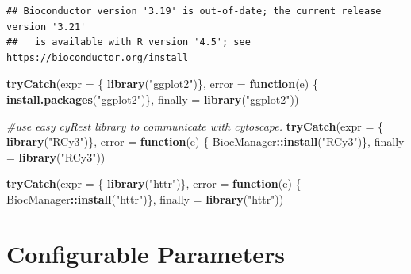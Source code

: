 \documentclass[
]{book}
\newenvironment{Shaded}{\begin{snugshade}}{\end{snugshade}}
\newcommand{\AttributeTok}[1]{\textcolor[rgb]{0.13,0.29,0.53}{#1}}
\newcommand{\CommentTok}[1]{\textcolor[rgb]{0.56,0.35,0.01}{\textit{#1}}}
\newcommand{\ControlFlowTok}[1]{\textcolor[rgb]{0.13,0.29,0.53}{\textbf{#1}}}
\newcommand{\FunctionTok}[1]{\textcolor[rgb]{0.13,0.29,0.53}{\textbf{#1}}}
\newcommand{\NormalTok}[1]{#1}
\newcommand{\SpecialCharTok}[1]{\textcolor[rgb]{0.81,0.36,0.00}{\textbf{#1}}}
\newcommand{\StringTok}[1]{\textcolor[rgb]{0.31,0.60,0.02}{#1}}
\begin{document}
\begin{verbatim}
## Bioconductor version '3.19' is out-of-date; the current release version '3.21'
##   is available with R version '4.5'; see https://bioconductor.org/install
\end{verbatim}

\begin{Shaded}
\begin{Highlighting}[]
\FunctionTok{tryCatch}\NormalTok{(}\AttributeTok{expr =}\NormalTok{ \{ }\FunctionTok{library}\NormalTok{(}\StringTok{"ggplot2"}\NormalTok{)\}, }
         \AttributeTok{error =} \ControlFlowTok{function}\NormalTok{(e) \{ }\FunctionTok{install.packages}\NormalTok{(}\StringTok{"ggplot2"}\NormalTok{)\}, }
         \AttributeTok{finally =} \FunctionTok{library}\NormalTok{(}\StringTok{"ggplot2"}\NormalTok{))}

\CommentTok{\#use easy cyRest library to communicate with cytoscape.}
\FunctionTok{tryCatch}\NormalTok{(}\AttributeTok{expr =}\NormalTok{ \{ }\FunctionTok{library}\NormalTok{(}\StringTok{"RCy3"}\NormalTok{)\}, }
         \AttributeTok{error =} \ControlFlowTok{function}\NormalTok{(e) \{ BiocManager}\SpecialCharTok{::}\FunctionTok{install}\NormalTok{(}\StringTok{"RCy3"}\NormalTok{)\}, }
         \AttributeTok{finally =} \FunctionTok{library}\NormalTok{(}\StringTok{"RCy3"}\NormalTok{))}

\FunctionTok{tryCatch}\NormalTok{(}\AttributeTok{expr =}\NormalTok{ \{ }\FunctionTok{library}\NormalTok{(}\StringTok{"httr"}\NormalTok{)\}, }
         \AttributeTok{error =} \ControlFlowTok{function}\NormalTok{(e) \{ BiocManager}\SpecialCharTok{::}\FunctionTok{install}\NormalTok{(}\StringTok{"httr"}\NormalTok{)\}, }
         \AttributeTok{finally =} \FunctionTok{library}\NormalTok{(}\StringTok{"httr"}\NormalTok{))}
\end{Highlighting}
\end{Shaded}

\section{Configurable Parameters}\label{configurable-parameters-3}
\end{document}
